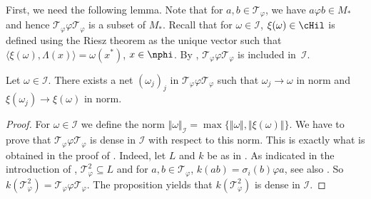 First, we need the following lemma. Note that for $a, b \in \mathcal{T}_\varphi$, we have $a \varphi b \in M_\ast$ and hence $\mathcal{T}_{\varphi} \varphi \mathcal{T}_{\varphi}$ is a subset of $M_\ast$. Recall that for $\omega \in \mathcal{I}$, $\xi(\omega) \in \cHil$ is def\/ined using the Riesz theorem as the unique vector such that $\langle  \xi(\omega) , \Lambda(x)\rangle = \omega(x^\ast)$, $x \in \nphi$. By \cite[Lemma~8.5]{KusVae}, $\mathcal{T}_\varphi \varphi \mathcal{T}_\varphi$ is included in~$\mathcal{I}$.

\begin{lem}\label{LemTechLem}
Let $\omega \in \mathcal{I}$. There exists a net $(\omega_j)_j$ in $\mathcal{T}_{\varphi} \varphi \mathcal{T}_{\varphi}$ such that $\omega_j \rightarrow \omega$ in norm and $\xi(\omega_j) \rightarrow \xi(\omega)$ in norm.
\end{lem}

\begin{proof}
 For $\omega \in \mathcal{I}$ we def\/ine the norm $\Vert \omega \Vert_{\mathcal{I}} = \max \{ \Vert \omega \Vert, \Vert \xi(\omega) \Vert \}$. We have to prove that $\mathcal{T}_{\varphi} \varphi \mathcal{T}_{\varphi}$ is dense in $\mathcal{I}$ with respect to this norm. This is exactly what is obtained in the proof of  \cite[Proposition 3.4]{Cas}. Indeed, let $ L$ and $k$ be as in \cite{Cas}. As indicated in the introduction of \cite{Cas},  $\mathcal{T}_{\varphi}^2 \subseteq L$ and for $a,b \in \mathcal{T}_{\varphi}$, $k(ab) = \sigma_i(b) \varphi a$, see also \cite[Corollary 2.15]{Cas}. So $k(\mathcal{T}_{\varphi}^2 ) = \mathcal{T}_{\varphi} \varphi \mathcal{T}_{\varphi}$. The proposition yields that $k(\mathcal{T}_{\varphi}^2 )$ is dense in $\mathcal{I}$.
\end{proof}

